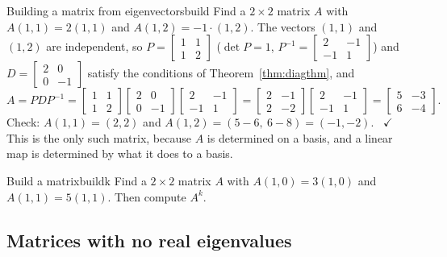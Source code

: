 \documentclass[11pt]{article}
\begin{document}
\begin{exmp}{Building a matrix from eigenvectors}{build}
Find a $2\times2$ matrix $A$ with $A(1,1)=2(1,1)$ and $A(1,2)=-1\cdot(1,2)$. The vectors $(1,1)$ and $(1,2)$ are independent, so $P=\begin{bmatrix}1&1\\1&2\end{bmatrix}$ ($\det P=1$, $P^{-1}=\begin{bmatrix}2&-1\\-1&1\end{bmatrix}$) and $D=\begin{bmatrix}2&0\\0&-1\end{bmatrix}$ satisfy the conditions of Theorem~\ref{thm:diagthm}, and
\[
A=PDP^{-1}=\begin{bmatrix}1&1\\1&2\end{bmatrix}\begin{bmatrix}2&0\\0&-1\end{bmatrix}\begin{bmatrix}2&-1\\-1&1\end{bmatrix}=\begin{bmatrix}2&-1\\2&-2\end{bmatrix}\begin{bmatrix}2&-1\\-1&1\end{bmatrix}=\begin{bmatrix}5&-3\\6&-4\end{bmatrix}.
\]
Check: $A(1,1)=(2,2)$ and $A(1,2)=(5-6,\ 6-8)=(-1,-2)$. \ $\checkmark$ This is the only such matrix, because $A$ is determined on a basis, and a linear map is determined by what it does to a basis.
\end{exmp}

\begin{kc}{Build a matrix}{buildk}
Find a $2\times2$ matrix $A$ with $A(1,0)=3(1,0)$ and $A(1,1)=5(1,1)$. Then compute $A^k$.
\end{kc}

\subsection*{Matrices with no real eigenvalues}
\end{document}

